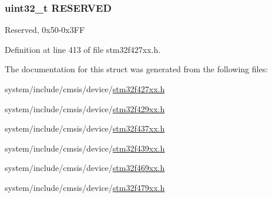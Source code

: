 \subsubsection[{\texorpdfstring{R\+E\+S\+E\+R\+V\+ED}{RESERVED}}]{\setlength{\rightskip}{0pt plus 5cm}uint32\+\_\+t R\+E\+S\+E\+R\+V\+ED}\hypertarget{struct_d_m_a2_d___type_def_a76f04b864709f67a7c16434b41ec7ea8}{}\label{struct_d_m_a2_d___type_def_a76f04b864709f67a7c16434b41ec7ea8}
Reserved, 0x50-\/0x3\+FF 

Definition at line 413 of file stm32f427xx.\+h.



The documentation for this struct was generated from the following files\+:\begin{DoxyCompactItemize}
\item 
system/include/cmsis/device/\hyperlink{stm32f427xx_8h}{stm32f427xx.\+h}\item 
system/include/cmsis/device/\hyperlink{stm32f429xx_8h}{stm32f429xx.\+h}\item 
system/include/cmsis/device/\hyperlink{stm32f437xx_8h}{stm32f437xx.\+h}\item 
system/include/cmsis/device/\hyperlink{stm32f439xx_8h}{stm32f439xx.\+h}\item 
system/include/cmsis/device/\hyperlink{stm32f469xx_8h}{stm32f469xx.\+h}\item 
system/include/cmsis/device/\hyperlink{stm32f479xx_8h}{stm32f479xx.\+h}\end{DoxyCompactItemize}
